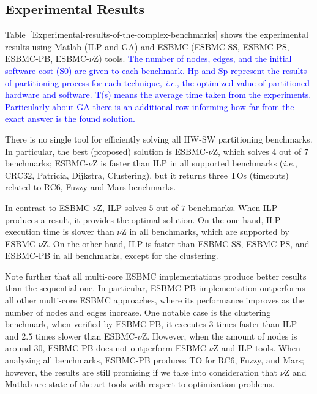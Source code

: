 \documentclass{doublecol-new}
\theoremstyle{TH}{
\newtheorem{lemma}{Lemma}
\newtheorem{theorem}[lemma]{Theorem}
\newtheorem{corrolary}[lemma]{Corrolary}
\newtheorem{conjecture}[lemma]{Conjecture}
\newtheorem{proposition}[lemma]{Proposition}
\newtheorem{claim}[lemma]{Claim}
\newtheorem{stheorem}[lemma]{Wrong Theorem}
\newtheorem{algorithm}{Algorithm}
}
\theoremstyle{THrm}{
\newtheorem{definition}{Definition}[section]
\newtheorem{question}{Question}[section]
\newtheorem{remark}{Remark}
\newtheorem{scheme}{Scheme}
}
\theoremstyle{THhit}{
\newtheorem{case}{Case}[section]
}
\begin{document}
\subsection{Experimental Results}
\label{Experimental-Results}

Table~\ref{Experimental-results-of-the-complex-benchmarks} shows the experimental results using Matlab (ILP and GA) and ESBMC (ESBMC-SS, ESBMC-PS, ESBMC-PB, ESBMC-$\nu$Z) tools. \textcolor{blue}{The number of nodes, edges, and the initial software cost (S0) are given to each benchmark. Hp and Sp represent the results of partitioning process for each technique, {\it i.e.}, the optimized value of partitioned hardware and software. T(s) means the average time taken from the experiments. Particularly about GA there is an additional row informing how far from the exact answer is the found solution.}

There is no single tool for efficiently solving all HW-SW partitioning benchmarks. In particular, the best (proposed) solution is ESBMC-$\nu$Z, which solves $4$ out of $7$ benchmarks; ESBMC-$\nu$Z is faster than ILP in all supported benchmarks ({\it i.e.}, CRC$32$, Patricia, Dijkstra, Clustering), but it returns three TOs (timeouts) related to RC6, Fuzzy and Mars benchmarks.

In contrast to ESBMC-$\nu$Z, ILP solves $5$ out of $7$ benchmarks. When ILP produces a result, it provides the optimal solution. On the one hand, ILP execution time is slower than $\nu$Z in all benchmarks, which are supported by ESBMC-$\nu$Z. On the other hand, ILP is faster than ESBMC-SS, ESBMC-PS, and ESBMC-PB in all benchmarks, except for the clustering.

Note further that all multi-core ESBMC implementations produce better results than the sequential one. In particular, ESBMC-PB implementation outperforms all other multi-core ESBMC approaches, where its performance improves as the number of nodes and edges increase. One notable case is the clustering benchmark, when verified by ESBMC-PB, it executes $3$ times faster than ILP and $2$.$5$ times slower than ESBMC-$\nu$Z. However, when the amount of nodes is around $30$, ESBMC-PB does not outperform ESBMC-$\nu$Z and ILP tools. When analyzing all benchmarks, ESBMC-PB produces TO for RC$6$, Fuzzy, and Mars; however, the results are still promising if we take into consideration that $\nu$Z and Matlab are state-of-the-art tools with respect to optimization problems.
\end{document}
